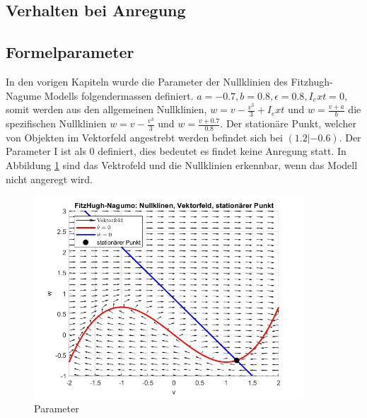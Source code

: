 \begin{refsection}
\section{Verhalten bei Anregung}
\subsection{Formelparameter}
In den vorigen Kapiteln wurde die Parameter der Nullklinien des Fitzhugh-Nagume Modells folgendermassen definiert.
\(a = -0.7, b = 0.8, \epsilon = 0.8, I_ext = 0\), somit werden aus den allgemeinen Nullklinien, \( w = v - \frac{v^3}{3} + I_ext\)
und \(w = \frac{v + a}{b}\) die spezifischen Nullklinien \( w = v - \frac{v^3}{3}\)
und \(w = \frac{v + 0.7}{0.8}\).
Der stationäre Punkt, welcher von Objekten im Vektorfeld angestrebt werden befindet sich bei \((1.2 |-0.6)\).
Der Parameter I ist als 0 definiert, dies bedeutet es findet keine Anregung statt.
In Abbildung \ref{fig:Parameter} sind das Vektrofeld und die Nullklinien erkennbar, wenn das Modell nicht angeregt wird.
\begin{figure}[H]
    \centering
    \includegraphics[width=0.9\textwidth]{papers/nerven/Bilder/Anregung1.png}
    \caption{Parameter}
    \label{fig:Parameter}
\end{figure}

\end{refsection}
